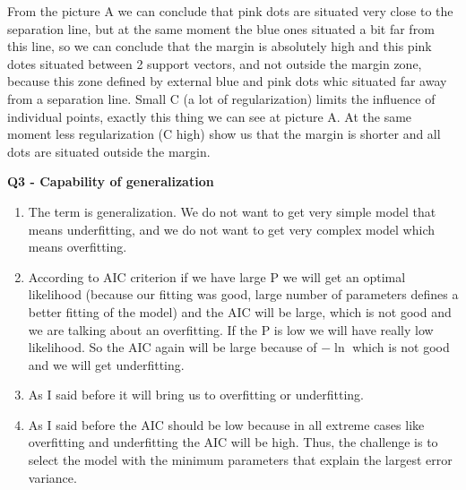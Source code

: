 \documentclass[12pt,a4paper]{article}
\begin{document}
From the picture A we can conclude that pink dots are situated very close to the separation line, but at the same moment the blue ones situated a bit far from this line, so we can conclude that the margin is absolutely high and this pink dotes situated between 2 support vectors, and not outside the margin zone, because this zone defined by external blue and pink dots whic situated far away from a separation line. Small C (a lot of regularization) limits the influence of individual points, exactly this thing we can see at picture A. At the same moment less regularization (C high) show us that the margin is shorter and all dots are situated outside the margin.
\newpage
\begin{center}
	\textbf{Q3 - Capability of generalization}
\end{center}
\begin{enumerate}[label=(\alph*)]
\item The term is generalization. We do not want to get very simple model that means underfitting, and we do not want to get very complex model which means overfitting. 
\item According to AIC criterion if we have large P we will get an optimal likelihood (because our fitting was good, large number of parameters defines a better fitting of the model) and the AIC will be large, which is not good and we are talking about an overfitting. If the P is low we will have really low likelihood. So the AIC again will be large because of $-\ln$ which is not good and we will get underfitting.
\item As I said before it will bring us to overfitting or underfitting.
\item As I said before the AIC should be low because in all extreme cases like overfitting and underfitting the AIC will be high. Thus, the challenge is to select the model with the minimum parameters that explain the largest error variance\cite{AIC}.

\end{enumerate}
\newpage


\end{document}
